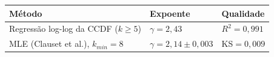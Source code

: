 \begin{tabular}{lll}
    \toprule
    Método & Expoente & Qualidade \\
    \midrule
    Regressão log-log da CCDF ($k\geq 5$) & $\gamma=2,43$ & $R^2=0,991$ \\
    MLE (Clauset et al.), $k_{min}=8$ & $\gamma=2,14\pm0,003$ & KS$=0,009$ \\
    \bottomrule
\end{tabular}
